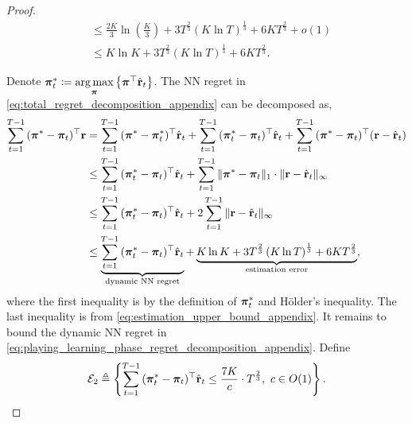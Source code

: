\begin{proof}
\begin{equation}
\begin{split}
    &\le \frac{2 K}{3} \ln{\left(\frac{K}{3}\right) } + 3 T^{\frac{2}{3}} \left( K \ln{T} \right) ^\frac{1}{3} + 6 K T^{\frac{2}{3}} + o(1) \\
    &\le K \ln{K} + 3 T^{\frac{2}{3}} \left( K \ln{T} \right) ^\frac{1}{3} + 6 K T^{\frac{2}{3}}.
\end{split}
\end{equation}

Denote ${\boldsymbol{\pi}}_t^* \coloneqq \operatorname*{arg\,max}\limits_{{\boldsymbol{\pi}}}{\left\{ {\boldsymbol{\pi}}^\top \hat{{\mathbf{r}}}_t\right\}}$. The NN regret in \cref{eq:total_regret_decomposition_appendix} can be decomposed as,
\begin{equation}
\label{eq:playing_learning_phase_regret_decomposition_appendix}
\begin{split}
    \sum\limits_{t=1}^{T-1}{ ( {{\boldsymbol{\pi}}^*} - {\boldsymbol{\pi}}_t )^\top {\mathbf{r}} } &=  \sum\limits_{t=1}^{T-1}{ ( {{\boldsymbol{\pi}}^*} - {{\boldsymbol{\pi}}_t^*} )^\top \hat{{\mathbf{r}}}_t } +  \sum\limits_{t=1}^{T-1}{ ( {{\boldsymbol{\pi}}_t^*} - {\boldsymbol{\pi}}_t )^\top \hat{{\mathbf{r}}}_t } +  \sum\limits_{t=1}^{T-1}{ ( {{\boldsymbol{\pi}}^*} - {\boldsymbol{\pi}}_t )^\top ( {\mathbf{r}} - \hat{{\mathbf{r}}}_t ) } \\
    &\le  \sum\limits_{t=1}^{T-1}{ ( {{\boldsymbol{\pi}}_t^*} - {\boldsymbol{\pi}}_t )^\top \hat{{\mathbf{r}}}_t }  + \sum\limits_{t=1}^{T-1}{ \| {\boldsymbol{\pi}}^* - {\boldsymbol{\pi}}_t \|_1 \cdot \| {\mathbf{r}} - \hat{{\mathbf{r}}}_t \|_\infty } \\
    &\le  \sum\limits_{t=1}^{T-1}{ ( {{\boldsymbol{\pi}}_t^*} - {\boldsymbol{\pi}}_t )^\top \hat{{\mathbf{r}}}_t } + 2  \sum\limits_{t=1}^{T-1}{ \| {\mathbf{r}} - \hat{{\mathbf{r}}}_t \|_\infty } \\
    &\le \underbrace{ \sum\limits_{t=1}^{T-1}{ ( {{\boldsymbol{\pi}}_t^*} - {\boldsymbol{\pi}}_t )^\top \hat{{\mathbf{r}}}_t } }_{\text{dynamic NN regret}} + \underbrace{K \ln{K} + 3 T^{\frac{2}{3}} \left( K \ln{T} \right) ^\frac{1}{3} + 6 K T^{\frac{2}{3}}}_{\text{estimation error}},
\end{split}
\end{equation}
where the first inequality is by the definition of ${\boldsymbol{\pi}}_t^*$ and  H{\"o}lder's inequality. The last inequality is from \cref{eq:estimation_upper_bound_appendix}. It remains to bound the dynamic NN regret in \cref{eq:playing_learning_phase_regret_decomposition_appendix}. Define
\begin{equation*}
    {\mathcal{E}}_2 \triangleq \left\{ \sum\limits_{t=1}^{T-1}{ (  {{\boldsymbol{\pi}}_t^*} - {\boldsymbol{\pi}}_t )^\top \hat{{\mathbf{r}}}_t } \le \frac{7 K}{c} \cdot  T^{\frac{2}{3}}, \ c \in O(1) \right\}.
\end{equation*}


\end{proof}

